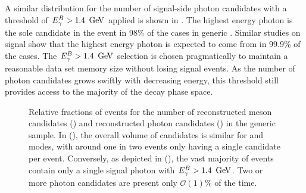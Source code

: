A similar distribution for the number of signal-side photon candidates with a threshold of ${E^B_{\gamma}}>1.4~\mathrm{\,Ge\kern -0.1em V}$ applied is shown in .
The highest energy photon is the sole candidate in the event in 98\% of the cases in generic \MC.
Similar studies on signal \MC show that the highest energy photon is expected to come from \BtoXsgamma in 99.9\% of the cases.
The ${E^B_{\gamma}}>1.4~\mathrm{\,Ge\kern -0.1em V}$ selection is chosen pragmatically to maintain a reasonable data set memory size without losing signal events.
As the number of photon candidates grows swiftly with decreasing energy, this threshold still provides access to the majority of the \BtoXsgamma decay phase space.
\begin{figure}[hbtp!]
    \centering
    \caption{\label{fig:reco_candidates} Relative fractions of events for the number of 
    reconstructed \B meson candidates () and
    reconstructed photon candidates () in the generic \MC sample.
    In (), the overall volume of candidates is similar for \feiBp and \feiBz modes, 
    with around one in two events only having a single candidate per event.
    Conversely, as depicted in (),
    the vast majority of events contain only a single signal photon with ${E^B_{\gamma}}>1.4~\mathrm{\,Ge\kern -0.1em V}$.
    Two or more photon candidates are present only $\mathcal{O}(1)\%$ of the time.
    }
\end{figure}

